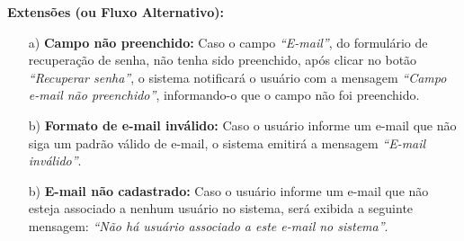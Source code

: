 \begin{mdframed}
\begin{flushleft}
		\textbf{Extensões (ou Fluxo Alternativo):}
		\begin{itemize}
			\item[a)] \textbf{Campo não preenchido:} Caso o campo \textit{``E-mail''}, do formulário de recuperação de senha, não tenha sido preenchido, após clicar no botão \textit{``Recuperar senha''}, o sistema notificará o usuário com a mensagem \textit{``Campo e-mail não preenchido''}, informando-o que o campo não foi preenchido.
			\item[b)] \textbf{Formato de e-mail inválido:} Caso o usuário informe um e-mail que não siga um padrão válido de e-mail, o sistema emitirá a mensagem \textit{``E-mail inválido''}.
			\item[b)] \textbf{E-mail não cadastrado:} Caso o usuário informe um e-mail que não esteja associado a nenhum usuário no sistema, será exibida a seguinte mensagem: \emph{``Não há usuário associado a este e-mail no sistema''}.
		\end{itemize}


		\end{flushleft}

	\end{mdframed}




